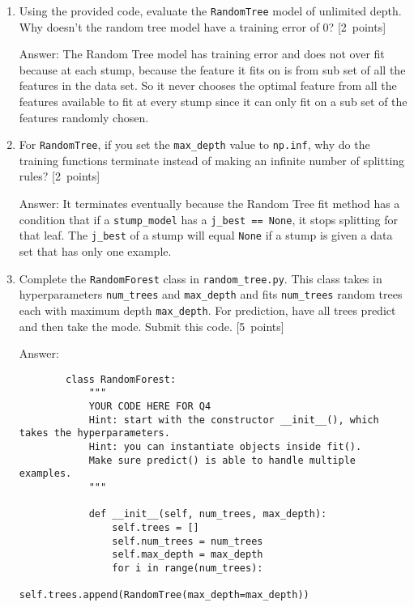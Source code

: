 \documentclass{article}
\newcommand{\blu}[1]{{\textcolor{blu}{#1}}}
\newcommand{\gre}[1]{\textcolor{gre}{#1}}
\newcommand\ans[1]{\par\gre{Answer: #1}}
\let\ask\blu
\newcommand\pts[1]{\textcolor{pointscolour}{[#1~points]}}
\begin{document}
    \begin{enumerate}
        \item Using the provided code, evaluate the \texttt{RandomTree} model of unlimited depth. \ask{Why doesn't the random tree model have a training error of 0?} \pts{2}

        \ans{The Random Tree model has training error and does not over fit because at each stump, because the feature it fits on is from sub set of all the features in the data set. So it never chooses the optimal feature from all the features available to fit at every stump since it can only fit on a sub set of the features randomly chosen. }
        
        \item For \texttt{RandomTree}, if you set the \texttt{max\_depth} value to \texttt{np.inf}, \ask{why do the training functions terminate instead of making an infinite number of splitting rules?} \pts{2}

        \ans{It terminates eventually because the Random Tree fit method has a condition that if a \texttt{stump\_model} has a \texttt{j\_best == None}, it stops splitting for that leaf. The \texttt{j\_best} of a stump will equal \texttt{None} if a stump is given a data set that has only one example.}
        \newpage
        
        \item Complete the \texttt{RandomForest} class in \texttt{random\string_tree.py}. This class takes in hyperparameters \texttt{num\string_trees} and \texttt{max\string_depth} and
        fits \texttt{num\string_trees} random trees each with maximum depth \texttt{max\string_depth}. For prediction, have all trees predict and then take the mode. \ask{Submit this code.} \pts{5}
        \ans{}
        \begin{verbatim}
        class RandomForest:
            """
            YOUR CODE HERE FOR Q4
            Hint: start with the constructor __init__(), which takes the hyperparameters.
            Hint: you can instantiate objects inside fit().
            Make sure predict() is able to handle multiple examples.
            """
        
            def __init__(self, num_trees, max_depth):
                self.trees = []
                self.num_trees = num_trees
                self.max_depth = max_depth
                for i in range(num_trees):
                    self.trees.append(RandomTree(max_depth=max_depth))
        

\end{verbatim}
\end{enumerate}
\end{document}
